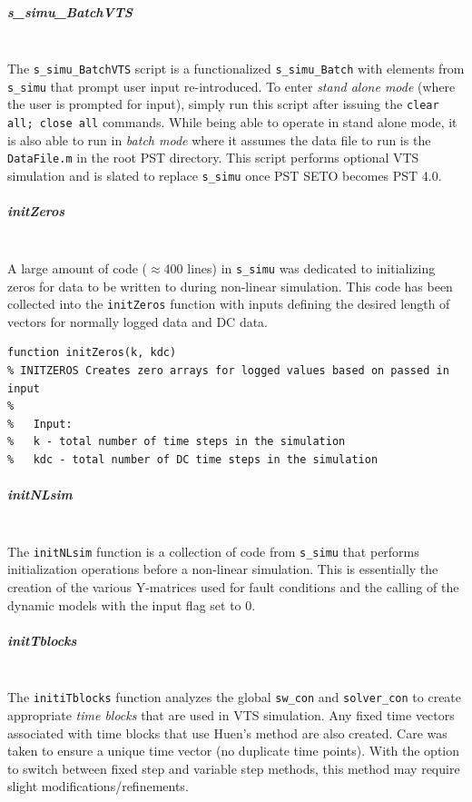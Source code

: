 \documentclass[12pt]{article}
\begin{document}
\subparagraph{s\_simu\_BatchVTS} \ \\
The \verb|s_simu_BatchVTS| script is a functionalized \verb|s_simu_Batch| with elements from \verb|s_simu| that prompt user input re-introduced.
To enter \emph{stand alone mode} (where the user is prompted for input), simply run this script after issuing the \verb|clear all; close all| commands.
While being able to operate in stand alone mode, it is also able to run in \emph{batch mode} where it assumes the data file to run is the \verb|DataFile.m| in the root PST directory.
This script performs optional VTS simulation and is slated to replace \verb|s_simu| once PST SETO becomes PST 4.0.


\subparagraph{initZeros} \ \\
A large amount of code ($\approx$400 lines) in \verb|s_simu| was dedicated to initializing zeros for data to be written to during non-linear simulation.
This code has been collected into the \verb|initZeros| function with inputs defining the desired length of vectors for normally logged data and DC data.

\begin{verbatim}
function initZeros(k, kdc)
% INITZEROS Creates zero arrays for logged values based on passed in input
%
%   Input:
%   k - total number of time steps in the simulation
%   kdc - total number of DC time steps in the simulation
\end{verbatim}

\subparagraph{initNLsim} \ \\
The \verb|initNLsim| function is a collection of code from \verb|s_simu| that performs initialization operations before a non-linear simulation.
This is essentially the creation of the various Y-matrices used for fault conditions and the calling of the dynamic models with the input flag set to 0.

\pagebreak
\subparagraph{initTblocks} \ \\
The \verb|initiTblocks| function analyzes the global \verb|sw_con| and \verb|solver_con| to create appropriate \emph{time blocks} that are used in VTS simulation.
Any fixed time vectors associated with time blocks that use Huen's method are also created.
Care was taken to ensure a unique time vector (no duplicate time points).
With the option to switch between fixed step and variable step  methods, this method may require slight modifications/refinements.
\end{document}
